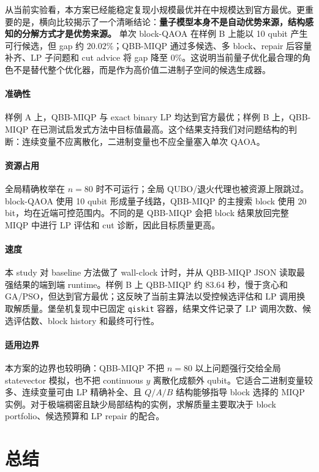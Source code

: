 \documentclass[UTF8,a4paper,11pt]{ctexart}
\begin{document}
从当前实验看，本方案已经能稳定复现小规模最优并在中规模达到官方最优。更重要的是，横向比较揭示了一个清晰结论：\textbf{量子模型本身不是自动优势来源，结构感知的分解方式才是优势来源。} 单次 block-QAOA 在样例 B 上能以 10 qubit 产生可行候选，但 gap 约 $20.02\%$；QBB-MIQP 通过多候选、多 block、repair 后容量补齐、LP 子问题和 cut advice 将 gap 降至 $0\%$。这说明当前量子优化最合理的角色不是替代整个优化器，而是作为高价值二进制子空间的候选生成器。

\paragraph{准确性}
样例 A 上，QBB-MIQP 与 exact binary LP 均达到官方最优；样例 B 上，QBB-MIQP 在已测试启发式方法中目标值最高。这个结果支持我们对问题结构的判断：连续变量不应离散化，二进制变量也不应全量塞入单次 QAOA。

\paragraph{资源占用}
全局精确枚举在 $n=80$ 时不可运行；全局 QUBO/退火代理也被资源上限跳过。block-QAOA 使用 10 qubit 形成量子线路，QBB-MIQP 的主搜索 block 使用 20 bit，均在近端可控范围内。不同的是 QBB-MIQP 会把 block 结果放回完整 MIQP 中进行 LP 评估和 cut 诊断，因此目标质量更高。

\paragraph{速度}
本 study 对 baseline 方法做了 wall-clock 计时，并从 QBB-MIQP JSON 读取最强结果的端到端 runtime。样例 B 上 QBB-MIQP 约 $83.64$ 秒，慢于贪心和 GA/PSO，但达到官方最优；这反映了当前主算法以受控候选评估和 LP 调用换取解质量。堡垒机复现中已固定 \texttt{qiskit} 容器，结果文件记录了 LP 调用次数、候选评估数、block history 和最终可行性。

\paragraph{适用边界}
本方案的边界也较明确：QBB-MIQP 不把 $n=80$ 以上问题强行交给全局 statevector 模拟，也不把 continuous $y$ 离散化成额外 qubit。它适合二进制变量较多、连续变量可由 LP 精确补全、且 $Q/A/B$ 结构能够指导 block 选择的 MIQP 实例。对于极端稠密且缺少局部结构的实例，求解质量主要取决于 block portfolio、候选预算和 LP repair 的配合。

\section{总结}
\end{document}

